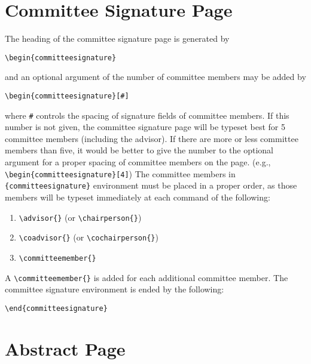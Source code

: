 \section{Committee Signature Page}

The heading of the committee signature page is generated by
\begin{verbatim}
\begin{committeesignature}
\end{verbatim}
and an optional argument of the number of committee members may be added by
\begin{verbatim}
\begin{committeesignature}[#]
\end{verbatim}
where \verb|#| controls the spacing of signature fields of committee members.
If this number is not given, the committee signature page will be typeset best
for 5 committee members (including the advisor).  If there are more or less
committee members than five, it would be better to give the number to the
optional argument for a proper spacing of committee members on the page. (e.g.,
\verb|\begin{committeesignature}[4]|)  The committee members in
\verb|{committeesignature}| environment must be placed in a proper order, as
those members will be typeset immediately at each command of the following:
\begin{enumerate}
    \item \verb|\advisor{}| (or \verb|\chairperson{}|)
    \item \verb|\coadvisor{}| (or \verb|\cochairperson{}|)
    \item \verb|\committeemember{}|
\end{enumerate}
A \verb|\committeemember{}| is added for each additional committee member.
The committee signature environment is ended by the following:
\begin{verbatim}
\end{committeesignature}
\end{verbatim}

\section{Abstract Page}

